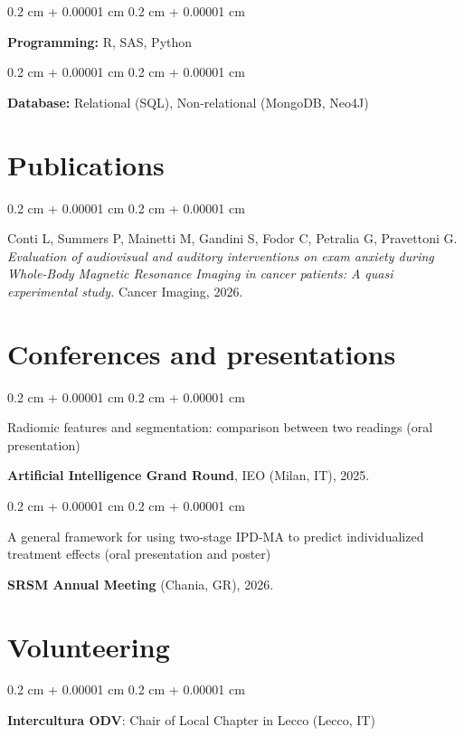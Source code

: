 \documentclass[10pt, letterpaper]{article}
\newenvironment{onecolentry}{
    \begin{adjustwidth}{
        0.2 cm + 0.00001 cm
    }{
        0.2 cm + 0.00001 cm
    }
}{
    \end{adjustwidth}
} %
\begin{document}
                \begin{onecolentry}
            \textbf{Programming:} R, SAS, Python
        \end{onecolentry}

        \vspace{0.1 cm}

                \begin{onecolentry}
            \textbf{Database:} Relational (SQL), Non-relational (MongoDB, Neo4J)
        \end{onecolentry}
    
    \section{Publications}

    \begin{onecolentry}
        Conti L, Summers P, Mainetti M, Gandini S, Fodor C, Petralia G, Pravettoni G.        
        \textit{Evaluation of audiovisual and auditory interventions on exam anxiety during Whole-Body Magnetic Resonance Imaging in cancer patients: A quasi experimental study.}
        Cancer Imaging, 2026.

       \end{onecolentry} 

    
    \section{Conferences and presentations}

    \begin{onecolentry}
        Radiomic features and segmentation: comparison between two readings (oral presentation)

        \textbf{Artificial Intelligence Grand Round}, IEO (Milan, IT), 2025.
        
    \end{onecolentry}

    \vspace{0.1 cm}
        
    \begin{onecolentry}
        A general framework for using two-stage IPD-MA to predict individualized treatment effects (oral presentation and poster)

        \textbf{SRSM Annual Meeting} (Chania, GR), 2026.
        
    \end{onecolentry}



        \vspace{0.1 cm}


  \section{Volunteering}
  \begin{onecolentry}
            \textbf{Intercultura ODV}: Chair of Local Chapter in Lecco (Lecco, IT)
            
        \end{onecolentry}
\end{document}
